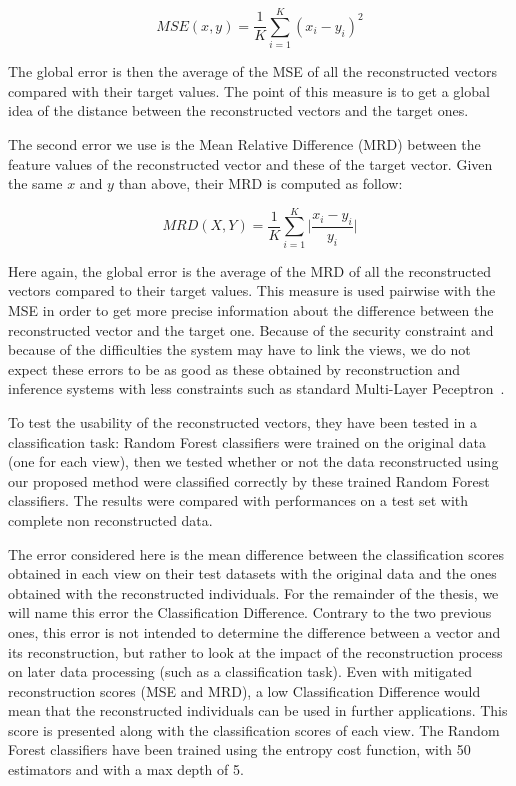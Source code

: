 	\begin{equation}
        MSE(x, y) = \frac{1}{K}\sum_{i = 1}^{K}{(x_i - y_i)}^2
	\end{equation}

The global error is then the average of the MSE of all the reconstructed vectors compared with their target values. The point of this measure is to get a global idea of the distance between the reconstructed vectors and the target ones.
	
The second error we use is the Mean Relative Difference (MRD) between the feature values of the reconstructed vector and these of the target vector. Given the same $x$ and $y$ than above, their MRD is computed as follow: 

	\begin{equation}
		MRD(X, Y) = \frac{1}{K}\sum_{i=1}^{K}\Big|\frac{x_i - y_i}{y_i}\Big|
	\end{equation}
	
Here again, the global error is the average of the MRD of all the reconstructed vectors compared to their target values. This measure is used pairwise with the MSE in order to get more precise information about the difference between the reconstructed vector and the target one. Because of the security constraint and because of the difficulties the system may have to link the views, we do not expect these errors to be as good as these obtained by reconstruction and inference systems with less constraints such as standard Multi-Layer Peceptron~\cite{vincent2010stacked}.
	
To test the usability of the reconstructed vectors, they have been tested in a classification task: Random Forest classifiers were trained on the original data (one for each view), then we tested whether or not the data reconstructed using our proposed method were classified correctly by these trained Random Forest classifiers. The results were compared with performances on a test set with complete non reconstructed data.
	
The error considered here is the mean difference between the classification scores obtained in each view on their test datasets with the original data and the ones obtained with the reconstructed individuals. For the remainder of the thesis, we will name this error the Classification Difference. Contrary to the two previous ones, this error is not intended to determine the difference between a vector and its reconstruction, but rather to look at the impact of the reconstruction process on later data processing (such as a classification task). Even with mitigated reconstruction scores (MSE and MRD), a low Classification Difference would mean that the reconstructed individuals can be used in further applications. This score is presented along with the classification scores of each view. The Random Forest classifiers have been trained using the entropy cost function, with 50 estimators and with a max depth of 5.\\

